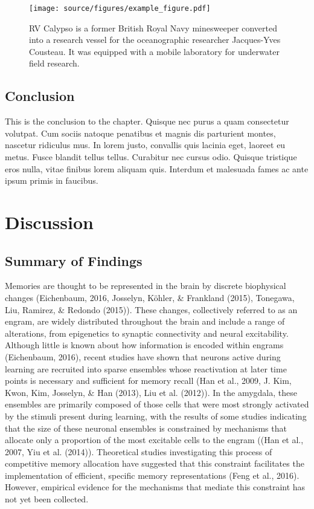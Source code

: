 \documentclass[12pt,a4paperpaper,]{report}
\begin{document}
\begin{figure}[htbp]
\centering
\texttt{[image: source/figures/example\_figure.pdf]}
\caption{RV Calypso is a former British Royal Navy minesweeper converted
into a research vessel for the oceanographic researcher Jacques-Yves
Cousteau. It was equipped with a mobile laboratory for underwater field
research. \label{ref_a_figure}}
\end{figure}

\section{Conclusion}\label{conclusion-2}

This is the conclusion to the chapter. Quisque nec purus a quam
consectetur volutpat. Cum sociis natoque penatibus et magnis dis
parturient montes, nascetur ridiculus mus. In lorem justo, convallis
quis lacinia eget, laoreet eu metus. Fusce blandit tellus tellus.
Curabitur nec cursus odio. Quisque tristique eros nulla, vitae finibus
lorem aliquam quis. Interdum et malesuada fames ac ante ipsum primis in
faucibus.

\chapter{Discussion}\label{discussion-2}

\section{Summary of Findings}\label{summary-of-findings}

Memories are thought to be represented in the brain by discrete
biophysical changes (Eichenbaum, 2016, Josselyn, Köhler, \& Frankland
(2015), Tonegawa, Liu, Ramirez, \& Redondo (2015)). These changes,
collectively referred to as an engram, are widely distributed throughout
the brain and include a range of alterations, from epigenetics to
synaptic connectivity and neural excitability. Although little is known
about how information is encoded within engrams (Eichenbaum, 2016),
recent studies have shown that neurons active during learning are
recruited into sparse ensembles whose reactivation at later time points
is necessary and sufficient for memory recall (Han et al., 2009, J. Kim,
Kwon, Kim, Josselyn, \& Han (2013), Liu et al. (2012)). In the amygdala,
these ensembles are primarily composed of those cells that were most
strongly activated by the stimuli present during learning, with the
results of some studies indicating that the size of these neuronal
ensembles is constrained by mechanisms that allocate only a proportion
of the most excitable cells to the engram ((Han et al., 2007, Yiu et al.
(2014)). Theoretical studies investigating this process of competitive
memory allocation have suggested that this constraint facilitates the
implementation of efficient, specific memory representations (Feng et
al., 2016). However, empirical evidence for the mechanisms that mediate
this constraint has not yet been collected.
\end{document}
